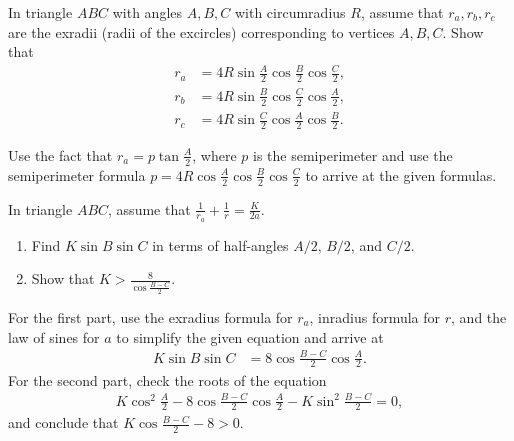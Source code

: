 \documentclass[12pt,a4paper]{memoir}
\theoremstyle{definition}
\begin{document}
	\begin{question}[name=Calculating the Exradii]
		In triangle $ABC$ with angles $A,B,C$ with circumradius $R$, assume that $r_a,r_b,r_c$ are the exradii (radii of the excircles) corresponding to vertices $A,B,C$. Show that
		\begin{align*}
			r_a &= 4R\sin\frac{A}{2}\cos\frac{B}{2}\cos\frac{C}{2},\\
			r_b &= 4R\sin\frac{B}{2}\cos\frac{C}{2}\cos\frac{A}{2},\\
			r_c &= 4R\sin\frac{C}{2}\cos\frac{A}{2}\cos\frac{B}{2}.
		\end{align*}
	\end{question}


\begin{solution}[name=Calculating the Exradii]
	Use the fact that $r_a = p \tan \frac{A}{2}$, where $p$ is the semiperimeter and use the semiperimeter formula $p=4R\cos\frac{A}{2}\cos\frac{B}{2}\cos\frac{C}{2}$ to arrive at the given formulas.
\end{solution}


\begin{question}
	In triangle $ABC$, assume that $\displaystyle \frac{1}{r_a} + \frac{1}{r} = \frac{K}{2a}$.
	\begin{enumerate}
		\item Find $K\sin B \sin C$ in terms of half-angles $A/2$, $B/2$, and $C/2$.
		\item Show that $K > \displaystyle\frac{8}{\displaystyle\cos \frac{B-C}{2}}.$
	\end{enumerate}
\end{question}

\begin{solution}
	For the first part, use the exradius formula for $r_a$, inradius formula for $r$, and the law of sines for $a$ to simplify the given equation and arrive at
	\begin{align*}
		K \sin B \sin C &= 8 \cos\frac{B-C}{2} \cos \frac{A}{2}.
	\end{align*}
	For the second part, check the roots of the equation
	\begin{align*}
		K\cos^2 \frac{A}{2} - 8 \cos\frac{B-C}{2} \cos \frac{A}{2} - K \sin^2 \frac{B-C}{2} = 0,
	\end{align*}
	and conclude that $K \cos\frac{B-C}{2} - 8 >0$.
\end{solution}
\end{document}

